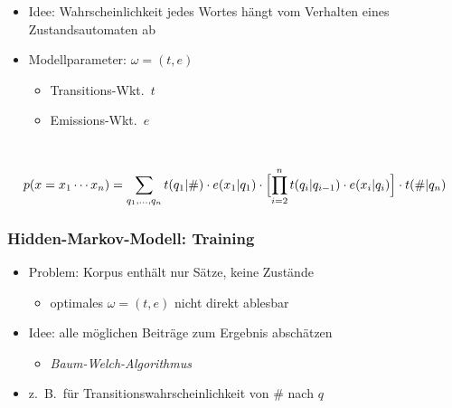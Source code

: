 \documentclass{beamer}
\begin{document}
\begin{frame}
\begin{columns}
  \begin{itemize}
   \item Idee: Wahrscheinlichkeit jedes Wortes hängt vom Verhalten eines Zustandsautomaten ab
   \pause\pause
   \item Modellparameter: $\omega=(t,e)$ %
    \begin{itemize}
     \item Transitions-Wkt.~$t$
     \item Emissions-Wkt.~$e$
    \end{itemize}
  \end{itemize}
 \end{columns}
 \scriptsize\vspace{1em}\[
  p(x=x_1\cdots x_n) = \sum_{q_1,\ldots,q_n} t(q_1|\#) \cdot e(x_1|q_1) \cdot \Bigl[\prod_{i=2}^n t(q_i|q_{i-1}) \cdot e(x_i|q_i)\Bigr] \cdot t(\#|q_n)
 \]
\end{frame}

\begin{frame}\frametitle{Hidden-Markov-Modell: Training}
 \begin{itemize}
  \item Problem: Korpus enthält nur Sätze, keine Zustände
   \begin{itemize}
    \item optimales $\omega = (t,e)$ nicht direkt ablesbar
   \end{itemize}
  \pause\item Idee: alle möglichen Beiträge zum Ergebnis abschätzen
   \begin{itemize}
    \item \emph{Baum-Welch-Algorithmus}
   \end{itemize}
  \pause\item z.~B.~für Transitionswahrscheinlichkeit von $\#$ nach $q$
   \begin{center}\end{center}
 \end{itemize}
\end{frame}
\end{document}
